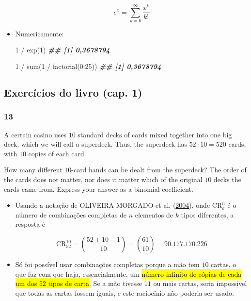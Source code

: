\documentclass[
  11pt]{report}
\newenvironment{Shaded}{\begin{snugshade}}{\end{snugshade}}
\newcommand{\DecValTok}[1]{\textcolor[rgb]{0.00,0.00,0.81}{#1}}
\newcommand{\DocumentationTok}[1]{\textcolor[rgb]{0.56,0.35,0.01}{\textbf{\textit{#1}}}}
\newcommand{\FunctionTok}[1]{\textcolor[rgb]{0.00,0.00,0.00}{#1}}
\newcommand{\NormalTok}[1]{#1}
\newcommand{\SpecialCharTok}[1]{\textcolor[rgb]{0.00,0.00,0.00}{#1}}
\renewenvironment{Shaded}{
    \begin{mdframed}[%
      roundcorner=2pt,%
      innerleftmargin=5pt,%
      innerrightmargin=5pt,%
      topline=true,%
      leftline=true,%
      rightline=true,%
      bottomline=true,%
      linewidth=0.5pt,%
      linecolor=black!20,%
      backgroundcolor=black!2,%
      skipabove=2ex,%
      skipbelow=2.5ex%
    ]%
  }
  {
    \end{mdframed}
  }
\begin{document}
\begin{itemize}
  \[
  e^x = \sum_{k=0}^\infty \frac{x^k}{k!}
  \]
\item
  Numericamente:

\begin{Shaded}
\begin{Highlighting}[]
\DecValTok{1} \SpecialCharTok{/} \FunctionTok{exp}\NormalTok{(}\DecValTok{1}\NormalTok{)}
\DocumentationTok{\#\# [1] 0,3678794}
\end{Highlighting}
\end{Shaded}

\begin{Shaded}
\begin{Highlighting}[]
\DecValTok{1} \SpecialCharTok{/} \FunctionTok{sum}\NormalTok{(}\DecValTok{1} \SpecialCharTok{/} \FunctionTok{factorial}\NormalTok{(}\DecValTok{0}\SpecialCharTok{:}\DecValTok{25}\NormalTok{))}
\DocumentationTok{\#\# [1] 0,3678794}
\end{Highlighting}
\end{Shaded}
\end{itemize}

\hypertarget{exercuxedcios-do-livro-cap.-1}{%
\subsection*{Exercícios do livro (cap. 1)}\label{exercuxedcios-do-livro-cap.-1}}

\hypertarget{section}{%
\subsubsection*{13}\label{section}}

\begin{rmdbox}
A certain casino uses $10$ standard decks of cards mixed together into one big deck, which we will call a superdeck. Thus, the superdeck has $52 \cdot 10 = 520$ cards, with $10$ copies of each card.

How many different $10$-card hands can be dealt from the superdeck? The order of the cards does not matter, nor does it matter which of the original $10$ decks the cards came from. Express your answer as a binomial coefficient.

\end{rmdbox}

\begin{itemize}
\item
  Usando a notação de OLIVEIRA MORGADO et al. (\protect\hyperlink{ref-oliveira-2004-analis}{2004}), onde $\text{CR}_k^n$ é o número de combinações completas de $n$ elementos de $k$ tipos diferentes, a resposta é

  \[
  \text{CR}_{52}^{10} = \binom{52 + 10 - 1}{10} = \binom{61}{10} =
  90.177.170.226
  \]
\item
  Só foi possível usar combinações completas porque a mão tem $10$ cartas, o que faz com que haja, essencialmente, um {\hl{número infinito de cópias de cada um dos $52$ tipos de carta}}. Se a mão tivesse $11$ ou mais cartas, seria impossível que todas as cartas fossem iguais, e este raciocínio não poderia ser usado.
\end{itemize}
\end{document}
